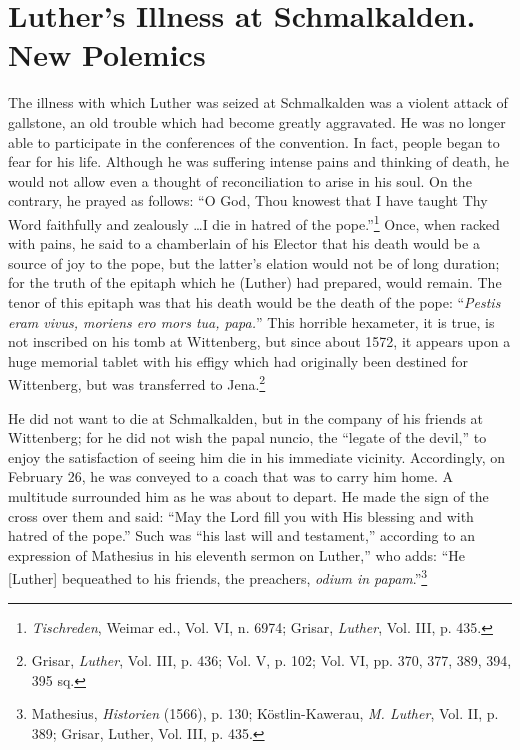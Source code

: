 \section{Luther’s Illness at Schmalkalden. New Polemics}

The illness with which Luther was seized at Schmalkalden was a
violent attack of gallstone, an old trouble which had become greatly
aggravated. He was no longer able to participate in the conferences
of the convention. In fact, people began to fear for his life. Although
he was suffering intense pains and thinking of death, he would not
allow even a thought of reconciliation to arise in his soul. On the
contrary, he prayed as follows: “O God, Thou knowest that I have
taught Thy Word faithfully and zealously \dots I die in hatred of
the pope.”\footnote
{\textit{Tischreden}, Weimar ed., Vol. VI, n. 6974; Grisar, \textit{Luther}, Vol. III, p. 435.}
Once, when racked with pains, he said to a chamberlain
of his Elector that his death would be a source of joy to the pope, but
the latter’s elation would not be of long duration; for the truth of
the epitaph which he (Luther) had prepared, would remain. The
tenor of this epitaph was that his death would be the death of the
pope: “\textit{Pestis eram vivus, moriens ero mors tua, papa.}” This horrible
hexameter, it is true, is not inscribed on his tomb at Wittenberg,
but since about 1572, it appears upon a huge memorial tablet with
his effigy which had originally been destined for Wittenberg, but was
transferred to Jena.\footnote
{Grisar, \textit{Luther}, Vol. III, p. 436; Vol. V, p. 102; Vol. VI, pp. 370, 377, 389, 394,
395 sq.}

He did not want to die at Schmalkalden, but in the company of his
friends at Wittenberg; for he did not wish the papal nuncio, the
“legate of the devil,” to enjoy the satisfaction of seeing him die in his
immediate vicinity. Accordingly, on February 26, he was conveyed
to a coach that was to carry him home. A multitude surrounded him
as he was about to depart. He made the sign of the cross over them
and said: “May the Lord fill you with His blessing and with hatred
of the pope.” Such was “his last will and testament,” according to an
expression of Mathesius in his eleventh sermon on Luther,” who adds:
``He [Luther] bequeathed to his friends, the preachers, \textit{odium in
papam}.''\footnote
{Mathesius, \textit{Historien} (1566), p. 130; Köstlin-Kawerau, \textit{M. Luther}, Vol. II, p. 389;
Grisar, Luther, Vol. III, p. 435.}

